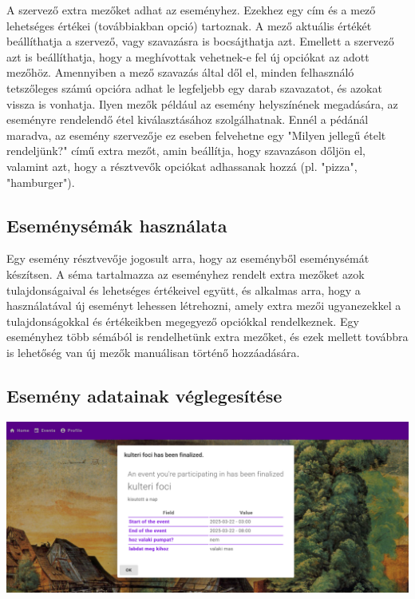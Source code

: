 \documentclass[a4paper,12pt]{report}
\theoremstyle{definition}
\theoremstyle{remark}
\begin{document}
A szervező extra mezőket adhat az eseményhez. Ezekhez egy cím és a mező lehetséges értékei (továbbiakban opció) tartoznak. A mező aktuális értékét beállíthatja a szervező, vagy szavazásra is bocsájthatja azt. Emellett a szervező azt is beállíthatja, hogy a meghívottak vehetnek-e fel új opciókat az adott mezőhöz. Amennyiben a mező szavazás által dől el, minden felhasználó tetszőleges számú opcióra adhat le legfeljebb egy darab szavazatot, és azokat vissza is vonhatja. Ilyen mezők például az esemény helyszínének megadására, az eseményre rendelendő étel kiválasztásához szolgálhatnak. Ennél a pédánál maradva, az esemény szervezője ez eseben felvehetne egy "Milyen jellegű ételt rendeljünk?" című extra mezőt, amin beállítja, hogy szavazáson dőljön el, valamint azt, hogy a résztvevők opciókat adhassanak hozzá (pl. "pizza", "hamburger"). 

	\subsection{Eseménysémák használata}

Egy esemény résztvevője jogosult arra, hogy az eseményből eseménysémát készítsen. A séma tartalmazza az eseményhez rendelt extra mezőket azok tulajdonságaival és lehetséges értékeivel együtt, és alkalmas arra, hogy a használatával új eseményt lehessen létrehozni, amely extra mezői ugyanezekkel a tulajdonságokkal és értékeikben megegyező opciókkal rendelkeznek. Egy eseményhez több sémából is rendelhetünk extra mezőket, és ezek mellett továbbra is lehetőség van új mezők manuálisan történő hozzáadására.

	\subsection{Esemény adatainak véglegesítése}

\begin{center}
\includegraphics[width=150mm]{notification}
\captionsetup{width=0.8\linewidth}
\end{center}
\end{document}
